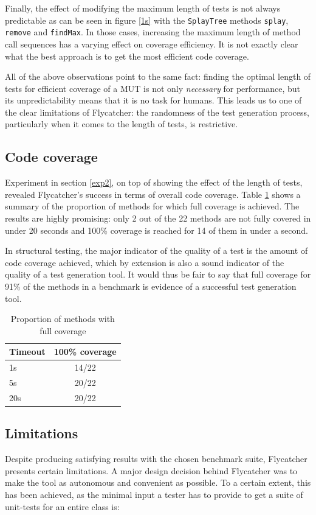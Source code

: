 Finally, the effect of modifying the maximum length of tests is not always predictable as can be seen in figure \ref{1s} with the \texttt{SplayTree} methods \texttt{splay}, \texttt{remove} and \texttt{findMax}. In those cases, increasing the maximum length of method call sequences has a varying effect on coverage efficiency. It is not exactly clear what the best approach is to get the most efficient code coverage.

All of the above observations point to the same fact: finding the optimal length of tests for efficient coverage of a MUT is not only \emph{necessary} for performance, but its unpredictability means that it is no task for humans. This leads us to one of the clear limitations of \textsf{Flycatcher}: the randomness of the test generation process, particularly when it comes to the length of tests, is restrictive.

\subsection{Code coverage}
Experiment in section \ref{exp2}, on top of showing the effect of the length of tests, revealed \textsf{Flycatcher}'s success in terms of overall code coverage. Table \ref{covresults} shows a summary of the proportion of methods for which full coverage is achieved. The results are highly promising: only 2 out of the 22 methods are not fully covered in under 20 seconds and 100\% coverage is reached for 14 of them in under a second.

In structural testing, the major indicator of the quality of a test is the amount of code coverage achieved, which by extension is also a sound indicator of the quality of a test generation tool. It would thus be fair to say that full coverage for 91\% of the methods in a benchmark is evidence of a successful test generation tool.

\begin{table}[t]
\centering
\begin{tabular}{|l|c|}
\hline
\textbf{Timeout} & \textbf{100\% coverage} \\
\hline
1s & 14/22 \\
5s & 20/22 \\
20s & 20/22 \\
\hline
\end{tabular}
\caption{Proportion of methods with full coverage}
\label{covresults}
\end{table}


\subsection{Limitations}
Despite producing satisfying results with the chosen benchmark suite, \textsf{Flycatcher} presents certain limitations. A major design decision behind \textsf{Flycatcher} was to make the tool as autonomous and convenient as possible. To a certain extent, this has been achieved, as the minimal input a tester has to provide to get a suite of unit-tests for an entire class is:

